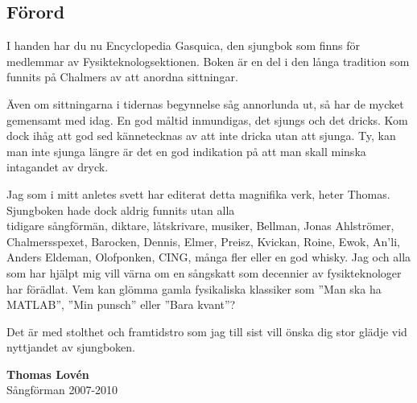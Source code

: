 \begin{flushleft}
\section{Förord}
\end{flushleft}

{\large
\setlength{\parskip}{0.8em}
I handen har du nu Encyclopedia Gasquica, den sjungbok som finns för medlemmar av Fysikteknologsektionen.
Boken är en del i den långa tradition som funnits på Chalmers av att anordna sittningar.

Även om sittningarna i tidernas begynnelse såg annorlunda ut, så har de mycket gemensamt med idag.
En god måltid inmundigas, det sjungs och det dricks.
Kom dock ihåg att god sed kännetecknas av att inte dricka utan att sjunga.
Ty, kan man inte sjunga längre är det en god indikation på att man skall minska intagandet av dryck.

Jag som i mitt anletes svett har editerat detta magnifika verk, heter Thomas.
Sjungboken hade dock aldrig funnits utan alla \\tidigare sångförmän, diktare, låtskrivare, musiker, Bellman, Jonas Ahlströmer, Chalmersspexet, Barocken,
Dennis, Elmer, Preisz, Kvickan, Roine, Ewok, An'li, Anders Eldeman, Olofponken, CING, många fler eller en god whisky.
Jag och alla som har hjälpt mig vill värna om en sångskatt som decennier av fysikteknologer har förädlat.
Vem kan glömma gamla fysikaliska klassiker som ''Man ska ha MATLAB'', ''Min punsch'' eller ''Bara kvant''?

Det är med stolthet och framtidstro som jag till sist vill önska dig stor glädje vid nyttjandet av sjungboken.

\vspace{0.5cm}
\begin{flushright}
\textbf{Thomas Lovén}\\
Sångförman 2007-2010
\end{flushright}
}

\newpage

